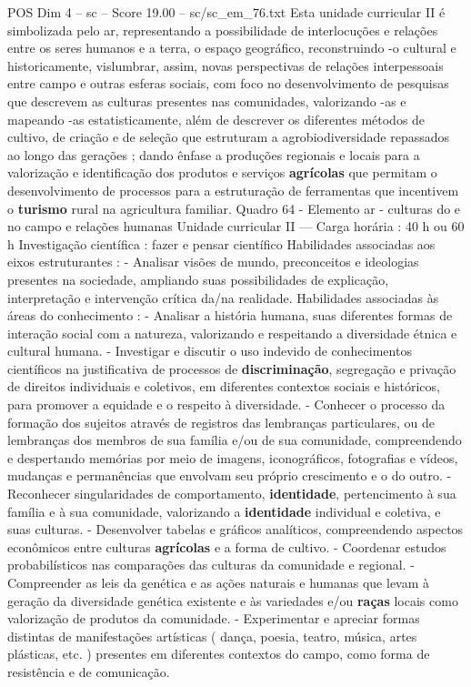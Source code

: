 \begin{textsample}{POS Dim 4 – sc – Score 19.00 – sc/sc\_em\_76.txt}
Esta unidade curricular II é simbolizada pelo ar, representando a possibilidade de interlocuções e relações entre os seres humanos e a terra, o espaço geográfico, reconstruindo -o cultural e historicamente, vislumbrar, assim, novas perspectivas de relações interpessoais entre campo e outras esferas sociais, com foco no desenvolvimento de pesquisas que descrevem as culturas presentes nas comunidades, valorizando -as e mapeando -as estatisticamente, além de descrever os diferentes métodos de cultivo, de criação e de seleção que estruturam a agrobiodiversidade repassados ao longo das gerações ; dando ênfase a produções regionais e locais para a valorização e identificação dos produtos e serviços \textbf{agrícolas} que permitam o desenvolvimento de processos para a estruturação de ferramentas que incentivem o \textbf{turismo} rural na agricultura familiar.
Quadro 64 - Elemento ar - culturas do e no campo e relações humanas Unidade curricular II — Carga horária : 40 h ou 60 h Investigação científica : fazer e pensar científico Habilidades associadas aos eixos estruturantes : - Analisar visões de mundo, preconceitos e ideologias presentes na sociedade, ampliando suas possibilidades de explicação, interpretação e intervenção crítica da/na realidade.
Habilidades associadas às áreas do conhecimento : - Analisar a história humana, suas diferentes formas de interação social com a natureza, valorizando e respeitando a diversidade étnica e cultural humana. - Investigar e discutir o uso indevido de conhecimentos científicos na justificativa de processos de \textbf{discriminação}, segregação e privação de direitos individuais e coletivos, em diferentes contextos sociais e históricos, para promover a equidade e o respeito à diversidade. - Conhecer o processo da formação dos sujeitos através de registros das lembranças particulares, ou de lembranças dos membros de sua família e/ou de sua comunidade, compreendendo e despertando memórias por meio de imagens, iconográficos, fotografias e vídeos, mudanças e permanências que envolvam seu próprio crescimento e o do outro. - Reconhecer singularidades de comportamento, \textbf{identidade}, pertencimento à sua família e à sua comunidade, valorizando a \textbf{identidade} individual e coletiva, e suas culturas. - Desenvolver tabelas e gráficos analíticos, compreendendo aspectos econômicos entre culturas \textbf{agrícolas} e a forma de cultivo. - Coordenar estudos probabilísticos nas comparações das culturas da comunidade e regional. - Compreender as leis da genética e as ações naturais e humanas que levam à geração da diversidade genética existente e às variedades e/ou \textbf{raças} locais como valorização de produtos da comunidade. - Experimentar e apreciar formas distintas de manifestações artísticas ( dança, poesia, teatro, música, artes plásticas, etc. ) presentes em diferentes contextos do campo, como forma de resistência e de comunicação.

\end{textsample}
